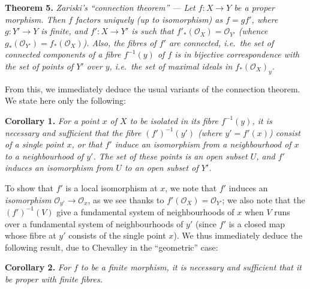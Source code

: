 \documentclass{article}
\newenvironment{itenv}[1]
  {\phantomsection\par\smallskip\noindent\textbf{#1.}\itshape}
  {\par\smallskip}
\newcommand{\oldpage}[1]{\marginpar{\footnotesize$\Big\vert$ \textit{p.~#1}}}
\theoremstyle{definition}
\theoremstyle{definition}
\theoremstyle{definition}
\theoremstyle{definition}
\theoremstyle{remark}
\begin{document}
\leavevmode{}%
\begin{itenv}{Theorem 5}
\emph{Zariski's ``connection theorem''} ---
Let \(f\colon X\to Y\) be a proper morphism.
Then \(f\) factors uniquely (up to isomorphism) as \(f=gf'\), where \(g\colon Y'\to Y\) is finite, and \(f'\colon X\to Y'\) is such that \(f'_*({\mathscr{O}}_X)={\mathscr{O}}_{Y'}\) (whence \(g_*({\mathscr{O}}_{Y'})=f_*({\mathscr{O}}_X)\)).
Also, the fibres of \(f'\) are connected, i.e.~the set of connected components of a fibre \(f^{-1}(y)\) of \(f\) is in bijective correspondence with the set of points of \(Y'\) over \(y\), i.e.~the set of maximal ideals in \(f_*({\mathscr{O}}_X)_y\).

\end{itenv}

\oldpage{182-06}From this, we immediately deduce the usual variants of the connection theorem.
We state here only the following:

\leavevmode{}%
\begin{itenv}{Corollary 1}
For a point \(x\) of \(X\) to be isolated in its fibre \(f^{-1}(y)\), it is necessary and sufficient that the fibre \((f')^{-1}(y')\) (where \(y'=f'(x)\)) consist of a single point \(x\), or that \(f'\) induce an isomorphism from a neighbourhood of \(x\) to a neighbourhood of \(y'\).
The set of these points is an open subset \(U\), and \(f'\) induces an isomorphism from \(U\) to an open subset of \(Y'\).

\end{itenv}

To show that \(f'\) is a local isomorphism at \(x\), we note that \(f'\) induces an \emph{isomorphism} \({\mathscr{O}}_{y'}\to{\mathscr{O}}_x\), as we see thanks to \(f'({\mathscr{O}}_X)={\mathscr{O}}_{Y'}\);
we also note that the \((f')^{-1}(V)\) give a fundamental system of neighbourhoods of \(x\) when \(V\) runs over a fundamental system of neighbourhoods of \(y'\) (since \(f'\) is a closed map whose fibre at \(y'\) consists of the single point \(x\)).
We thus immediately deduce the following result, due to Chevalley in the ``geometric'' case:

\leavevmode{}%
\begin{itenv}{Corollary 2}
For \(f\) to be a finite morphism, it is necessary and sufficient that it be proper with finite fibres.

\end{itenv}
\end{document}
